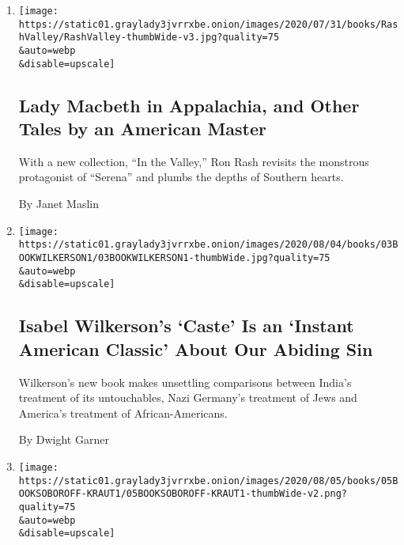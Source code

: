 \begin{enumerate}
\def\labelenumi{\arabic{enumi}.}
\item
  \href{/2020/08/02/books/ron-rash-in-valley-serena.html}{}

  \texttt{[image: https://static01.graylady3jvrrxbe.onion/images/2020/07/31/books/RashValley/RashValley-thumbWide-v3.jpg?quality=75\\\&auto=webp\\\&disable=upscale]}

  \hypertarget{lady-macbeth-in-appalachia-and-other-tales-by-an-american-master}{%
  \subsection{Lady Macbeth in Appalachia, and Other Tales by an American
  Master}\label{lady-macbeth-in-appalachia-and-other-tales-by-an-american-master}}

  With a new collection, ``In the Valley,'' Ron Rash revisits the
  monstrous protagonist of ``Serena'' and plumbs the depths of Southern
  hearts.

  By Janet Maslin
\item
  \href{/2020/07/31/books/review-caste-isabel-wilkerson-origins-of-our-discontents.html}{}

  \texttt{[image: https://static01.graylady3jvrrxbe.onion/images/2020/08/04/books/03BOOKWILKERSON1/03BOOKWILKERSON1-thumbWide.jpg?quality=75\\\&auto=webp\\\&disable=upscale]}

  \hypertarget{isabel-wilkersons-caste-is-an-instant-american-classic-about-our-abiding-sin}{%
  \subsection{Isabel Wilkerson's `Caste' Is an `Instant American
  Classic' About Our Abiding
  Sin}\label{isabel-wilkersons-caste-is-an-instant-american-classic-about-our-abiding-sin}}

  Wilkerson's new book makes unsettling comparisons between India's
  treatment of its untouchables, Nazi Germany's treatment of Jews and
  America's treatment of African-Americans.

  By Dwight Garner
\item
  \href{/2020/07/30/books/review-threat-dissent-julia-rose-kraut-separated-jacob-soboroff.html}{}

  \texttt{[image: https://static01.graylady3jvrrxbe.onion/images/2020/08/05/books/05BOOKSOBOROFF-KRAUT1/05BOOKSOBOROFF-KRAUT1-thumbWide-v2.png?quality=75\\\&auto=webp\\\&disable=upscale]}


\end{enumerate}
